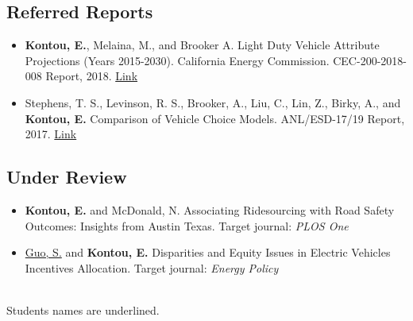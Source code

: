 \documentclass[margin,line]{resume}
\begin{document}
\begin{resume}
    \vspace{-0.3in}
\subsection{\mysidestyle \bf Referred Reports}

\begin{itemize}
\item {\bf Kontou, E.}, Melaina, M., and Brooker A. Light Duty Vehicle Attribute Projections (Years 2015-2030). California Energy Commission. CEC-200-2018-008 Report, 2018. \href{https://www.nrel.gov/docs/fy18osti/70455.pdf}{Link}
\item Stephens, T. S., Levinson, R. S., Brooker, A., Liu, C., Lin, Z., Birky, A., and {\bf Kontou, E.} Comparison of Vehicle Choice Models. ANL/ESD-17/19 Report, 2017. \href{https://www.osti.gov/biblio/1418338}{Link}

\end{itemize}
    \vspace{-0.3in}
\subsection{\mysidestyle \bf Under Review}

\begin{itemize}

\item {\bf Kontou, E.} and McDonald, N. Associating Ridesourcing with Road Safety Outcomes: Insights from Austin Texas. Target journal: {\em PLOS One}

\item \underline{Guo, S.} and {\bf Kontou, E.} Disparities and Equity Issues in Electric Vehicles Incentives Allocation. Target journal: {\em Energy Policy}

\end{itemize}
\\
    \vspace{-0.2in}
Students names are underlined.
    



 \vspace{-0.2in}

\end{resume}
\end{document}

